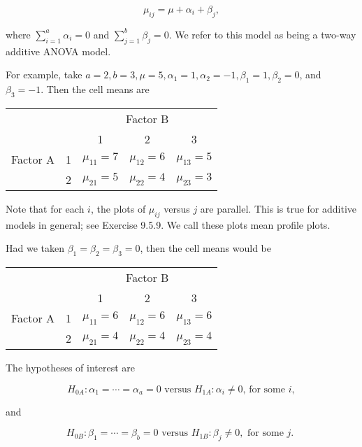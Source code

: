 \begin{equation*}
\mu_{i j}=\mu+\alpha_{i}+\beta_{j}, \tag{9.5.2}
\end{equation*}


where $\sum_{i=1}^{a} \alpha_{i}=0$ and $\sum_{j=1}^{b} \beta_{j}=0$. We refer to this model as being a two-way additive ANOVA model.

For example, take $a=2, b=3, \mu=5, \alpha_{1}=1, \alpha_{2}=-1, \beta_{1}=1, \beta_{2}=0$, and $\beta_{3}=-1$. Then the cell means are

\begin{center}
\begin{tabular}{|cc|ccc|}
\hline
 &  & \multicolumn{3}{|c|}{Factor B} \\
 &  & 1 & 2 & 3 \\
\hline
Factor A & 1 & $\mu_{11}=7$ & $\mu_{12}=6$ & $\mu_{13}=5$ \\
 & 2 & $\mu_{21}=5$ & $\mu_{22}=4$ & $\mu_{23}=3$ \\
\hline
\end{tabular}
\end{center}

Note that for each $i$, the plots of $\mu_{i j}$ versus $j$ are parallel. This is true for additive models in general; see Exercise 9.5.9. We call these plots mean profile plots.

Had we taken $\beta_{1}=\beta_{2}=\beta_{3}=0$, then the cell means would be

\begin{center}
\begin{tabular}{|lc|ccc|}
\hline
 &  & \multicolumn{3}{|c|}{Factor B} \\
 &  & 1 & 2 & 3 \\
\hline
Factor A & 1 & $\mu_{11}=6$ & $\mu_{12}=6$ & $\mu_{13}=6$ \\
 & 2 & $\mu_{21}=4$ & $\mu_{22}=4$ & $\mu_{23}=4$ \\
\hline
\end{tabular}
\end{center}

The hypotheses of interest are


\begin{equation*}
H_{0 A}: \alpha_{1}=\cdots=\alpha_{a}=0 \text { versus } H_{1 A}: \alpha_{i} \neq 0 \text {, for some } i, \tag{9.5.3}
\end{equation*}


and


\begin{equation*}
H_{0 B}: \beta_{1}=\cdots=\beta_{b}=0 \text { versus } H_{1 B}: \beta_{j} \neq 0, \text { for some } j \text {. } \tag{9.5.4}
\end{equation*}


